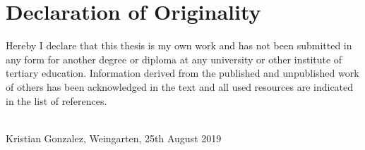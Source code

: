 \vspace*{1.5cm}

\section*{Declaration of Originality}
Hereby I declare that this thesis is my own work and has not been submitted in any form for another degree or diploma at any university or other institute of tertiary education. Information derived from the published and unpublished work of others has been acknowledged in the text and all used resources are indicated in the list of references.

\vspace{1cm}

\underline{\hspace{5cm}}\\

Kristian Gonzalez, Weingarten, 25th August 2019
